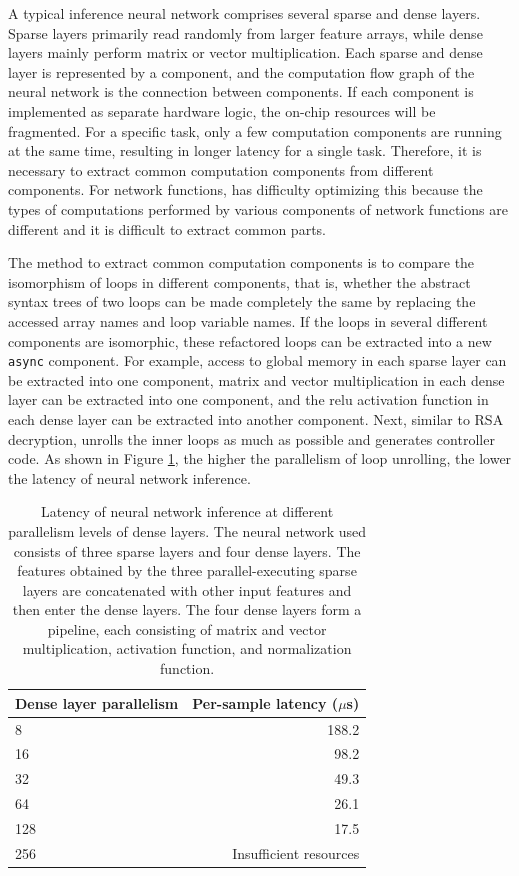 A typical inference neural network comprises several sparse and dense layers. Sparse layers primarily read randomly from larger feature arrays, while dense layers mainly perform matrix or vector multiplication. Each sparse and dense layer is represented by a \name component, and the computation flow graph of the neural network is the connection between \name components. If each component is implemented as separate hardware logic, the on-chip resources will be fragmented. For a specific task, only a few computation components are running at the same time, resulting in longer latency for a single task. Therefore, it is necessary to extract common computation components from different components. For network functions, \name has difficulty optimizing this because the types of computations performed by various components of network functions are different and it is difficult to extract common parts.

The method to extract common computation components is to compare the isomorphism of loops in different components, that is, whether the abstract syntax trees of two loops can be made completely the same by replacing the accessed array names and loop variable names. If the loops in several different components are isomorphic, these refactored loops can be extracted into a new \texttt{async} component. For example, access to global memory in each sparse layer can be extracted into one component, matrix and vector multiplication in each dense layer can be extracted into one component, and the relu activation function in each dense layer can be extracted into another component. Next, similar to RSA decryption, \name unrolls the inner loops as much as possible and generates controller code. As shown in Figure \ref{clicknp:tab:neural-network}, the higher the parallelism of loop unrolling, the lower the latency of neural network inference.

\begin{table}[htbp]
	\centering
	\caption{Latency of neural network inference at different parallelism levels of dense layers. The neural network used consists of three sparse layers and four dense layers. The features obtained by the three parallel-executing sparse layers are concatenated with other input features and then enter the dense layers. The four dense layers form a pipeline, each consisting of matrix and vector multiplication, activation function, and normalization function.}
	\label{clicknp:tab:neural-network}
	\small
	\begin{tabular}{l|r}
		\toprule
		Dense layer parallelism & Per-sample latency ($\mu$s) \\
		\midrule
		8 & 188.2 \\
		16 & 98.2 \\
		32 & 49.3 \\
		64 & 26.1 \\
		128 & 17.5 \\
		256 & Insufficient resources \\
		\bottomrule
	\end{tabular}
\end{table}

